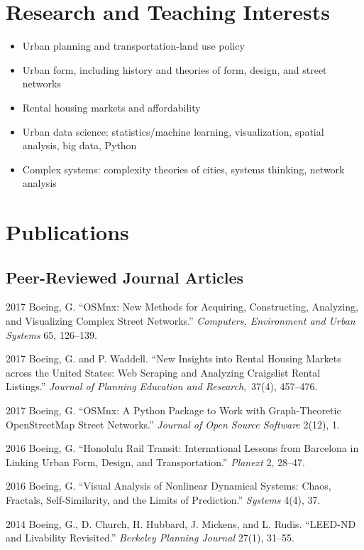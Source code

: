 \documentclass{academiccv}
\begin{document}
\section*{Research and Teaching Interests}

\begin{itemize}
\item Urban planning and transportation-land use policy
\item Urban form, including history and theories of form, design, and street networks
\item Rental housing markets and affordability
\item Urban data science: statistics/machine learning, visualization, spatial analysis, big data, Python
\item Complex systems: complexity theories of cities, systems thinking, network analysis
\end{itemize}



\section*{Publications}

\subsection*{Peer-Reviewed Journal Articles}

\begin{tablist}

\item[2017] \tab Boeing, G. \enquote{OSMnx: New Methods for Acquiring, Constructing, Analyzing, and Visualizing Complex Street Networks.} \emph{Computers, Environment and Urban Systems} 65, 126--139.

\item[2017] \tab Boeing, G. and P. Waddell. \enquote{New Insights into Rental Housing Markets across the United States: Web Scraping and Analyzing Craigslist Rental Listings.} \emph{Journal of Planning Education and Research}, 37(4), 457--476.

\item[2017] \tab Boeing, G. \enquote{OSMnx: A Python Package to Work with Graph-Theoretic OpenStreetMap Street Networks.} \emph{Journal of Open Source Software} 2(12), 1.

\item[2016] \tab Boeing, G. \enquote{Honolulu Rail Transit: International Lessons from Barcelona in Linking Urban Form, Design, and Transportation.} \emph{Planext} 2, 28--47.

\item[2016] \tab Boeing, G. \enquote{Visual Analysis of Nonlinear Dynamical Systems: Chaos, Fractals, Self-Similarity, and the Limits of Prediction.} \emph{Systems} 4(4), 37.

\item[2014] \tab Boeing, G., D. Church, H. Hubbard, J. Mickens, and L. Rudis. \enquote{LEED-ND and Livability Revisited.} \emph{Berkeley Planning Journal} 27(1), 31--55.

\end{tablist}
\end{document}
